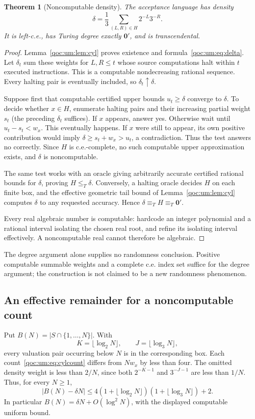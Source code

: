 \documentclass[11pt,letterpaper]{article}
\newtheorem{theorem}{Theorem}[section]
\theoremstyle{definition}
\theoremstyle{remark}
\begin{document}
\begin{theorem}[Noncomputable density]\label{qoc:um:thm:density}
The acceptance language has density
\begin{equation}\label{qoc:um:eq:delta}
 \delta=\frac13\sum_{(L,R)\in H}2^{-L}3^{-R}.
\end{equation}
It is left-c.e., has Turing degree exactly $\mathbf0'$, and is transcendental.
\end{theorem}
\begin{proof}
Lemma~\ref{qoc:um:lem:cyl} proves existence and formula~\eqref{qoc:um:eq:delta}. Let $\delta_t$ sum these weights for $L,R\leq t$ whose source computations halt within $t$ executed instructions. This is a computable nondecreasing rational sequence. Every halting pair is eventually included, so $\delta_t\uparrow\delta$.

Suppose first that computable certified upper bounds $u_t\geq\delta$ converge to $\delta$. To decide whether $x\in H$, enumerate halting pairs and their increasing partial weight $s_t$ (the preceding $\delta_t$ suffices). If $x$ appears, answer yes. Otherwise wait until $u_t-s_t<w_x$. This eventually happens. If $x$ were still to appear, its own positive contribution would imply $\delta\geq s_t+w_x>u_t$, a contradiction. Thus the test answers no correctly. Since $H$ is c.e.-complete, no such computable upper approximation exists, and $\delta$ is noncomputable.

The same test works with an oracle giving arbitrarily accurate certified rational bounds for $\delta$, proving $H\leq_T\delta$. Conversely, a halting oracle decides $H$ on each finite box, and the effective geometric tail bound of Lemma~\ref{qoc:um:lem:cyl} computes $\delta$ to any requested accuracy. Hence $\delta\equiv_T H\equiv_T\mathbf0'$.

Every real algebraic number is computable: hardcode an integer polynomial and a rational interval isolating the chosen real root, and refine its isolating interval effectively. A noncomputable real cannot therefore be algebraic.
\end{proof}

The degree argument alone supplies no randomness conclusion. Positive computable summable weights and a complete c.e. index set suffice for the degree argument; the construction is not claimed to be a new randomness phenomenon.

\subsection{An effective remainder for a noncomputable count}
Put $B(N)=|S\cap\{1,\ldots,N\}|$. With
\[
 K=\lfloor\log_2N\rfloor,\qquad J=\lfloor\log_3N\rfloor,
\]
every valuation pair occurring below $N$ is in the corresponding box. Each count~\eqref{qoc:um:eq:cylcount} differs from $Nw_x$ by less than four. The omitted density weight is less than $2/N$, since both $2^{-K-1}$ and $3^{-J-1}$ are less than $1/N$. Thus, for every $N\geq1$,
\begin{equation}\label{qoc:um:eq:error}
 |B(N)-\delta N|
 \leq4(1+\lfloor\log_2N\rfloor)(1+\lfloor\log_3N\rfloor)+2.
\end{equation}
In particular $B(N)=\delta N+O(\log^2N)$, with the displayed computable uniform bound.
\end{document}
